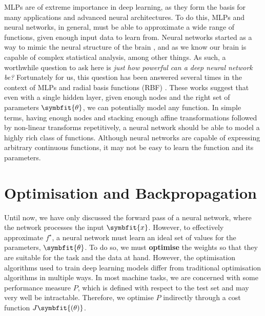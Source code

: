 MLPs are of extreme importance in deep learning, as they form the basis for many applications and advanced neural architectures. To do this, MLPs and neural networks, in general, must be able to approximate a wide range of functions, given enough input data to learn from. Neural networks started as a way to mimic the neural structure of the brain \parencite{mcculloch1943logical}, and as we know our brain is capable of complex statistical analysis, among other things. As such, a worthwhile question to ask here is \textit{just how powerful can a deep neural network be?}
Fortunately for us, this question has been answered several times in the context of MLPs and radial basis functions (RBF) \parencite{Cybenko1989, Micchelli1986, Hornik1991}. These works suggest that even with a single hidden layer, given enough nodes and the right set of parameters $\symbfit{\theta}$, we can potentially model any function. 
In simple terms, having enough nodes and stacking enough affine transformations followed by non-linear transforms repetitively, a neural network should be able to model a highly rich class of functions.
Although neural networks are capable of expressing arbitrary continuous functions, it may not be easy to learn the function and its parameters.

\section{Optimisation and Backpropagation}\label{sec:optimisation}

Until now, we have only discussed the forward pass of a neural network, where the network processes the input $\symbfit{x}$. However, to effectively approximate $f^\star$, a neural network must learn an ideal set of values for the parameters, $\symbfit{\theta}$. To do so, we must \textbf{optimise} the weights so that they are suitable for the task and the data at hand. However, the optimisation algorithms used to train deep learning models differ from traditional optimisation algorithms in multiple ways. In most machine tasks, we are concerned with some performance measure $P$, which is defined with respect to the test set and may very well be intractable. Therefore, we optimise $P$ indirectly through a cost function $J\symbfit{(\theta)}$.


